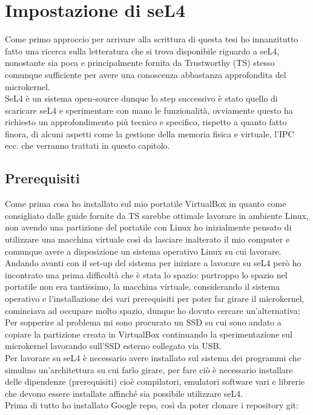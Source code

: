\chapter{Impostazione di seL4}
Come primo approccio per arrivare alla scrittura di questa tesi ho innanzitutto fatto una ricerca sulla letteratura che si trova disponibile riguardo a seL4, nonostante sia poca e principalmente fornita da Trustworthy (TS) stesso comunque sufficiente per avere una conoscenza abbastanza approfondita del microkernel.\\
SeL4 è un sistema open-source dunque lo step successivo è stato quello di scaricare seL4 e sperimentare con mano le funzionalità, ovviamente questo ha richiesto un approfondimento più tecnico e specifico, rispetto a quanto fatto finora, di alcuni aspetti come la gestione della memoria fisica e virtuale, l'IPC ecc. che verranno trattati in questo capitolo.

\section{Prerequisiti}
Come prima cosa ho installato sul mio portatile VirtualBox in quanto come consigliato dalle guide fornite da TS sarebbe ottimale lavorare in ambiente Linux, non avendo una partizione del portatile con Linux ho inizialmente pensato di utilizzare una macchina virtuale così da lasciare inalterato il mio computer e comunque avere a disposizione un sistema operativo Linux su cui lavorare. Andando avanti con il set-up del sistema per iniziare a lavorare su seL4 però ho incontrato una prima difficoltà che è stata lo spazio: purtroppo lo spazio nel portatile non era tantissimo, la macchina virtuale, considerando il sistema operativo e l'installazione dei vari prerequisiti per poter far girare il microkernel, cominciava ad occupare molto spazio, dunque ho dovuto cercare un'alternativa; Per sopperire al problema mi sono procurato un SSD su cui sono andato a copiare la partizione creata in VirtualBox continuando la sperimentazione sul microkernel lavorando sull'SSD esterno collegato via USB.\\
Per lavorare su seL4 è necessario avere installato sul sistema dei programmi che simulino un'architettura su cui farlo girare, per fare ciò è necessario installare delle dipendenze (prerequisiti) cioè compilatori, emulatori software vari e librerie che devono essere installate affinché sia possibile utilizzare seL4.\\
Prima di tutto ho installato Google repo, così da poter clonare i repository git:


